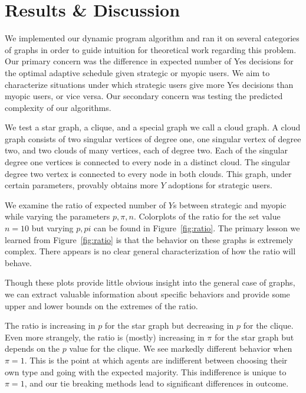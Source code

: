 \documentclass{article}
\begin{document}
\section{Results \& Discussion}
We implemented our dynamic program algorithm and ran it on several categories of graphs in order to guide intuition for theoretical work regarding this problem. Our primary concern was the difference in expected number of Yes decisions for the optimal adaptive schedule given strategic or myopic users. We aim to characterize situations under which strategic users give more Yes decisions than myopic users, or vice versa. Our secondary concern was testing the predicted complexity of our algorithms.

We test a star graph, a clique, and a special graph we call a cloud graph. A cloud graph consists of two singular vertices of degree one, one singular vertex of degree two, and two clouds of many vertices, each of degree two. Each of the singular degree one vertices is connected to every node in a distinct cloud. The singular degree two vertex is connected to every node in both clouds. This graph, under certain parameters, provably obtains more $Y$ adoptions for strategic users.

We examine the ratio of expected number of $Y$s between strategic and myopic while varying the parameters $p, \pi, n$. Colorplots of the ratio for the set value $n=10$ but varying $p, pi$ can be found in Figure~\ref{fig:ratio}. The primary lesson we learned from Figure~\ref{fig:ratio} is that the behavior on these graphs is extremely complex. There appears is no clear general characterization of how the ratio will behave.

Though these plots provide little obvious insight into the general case of graphs, we can extract valuable information about specific behaviors and provide some upper and lower bounds on the extremes of the ratio.

The ratio is increasing in $p$ for the star graph but decreasing in $p$ for the clique. Even more strangely, the ratio is (mostly) increasing in $\pi$ for the star graph but depends on the $p$ value for the clique. We see markedly different behavior when $\pi = 1$. This is the point at which agents are indifferent between choosing their own type and going with the expected majority. This indifference is unique to $\pi=1$, and our tie breaking methods lead to significant differences in outcome.
\end{document}

